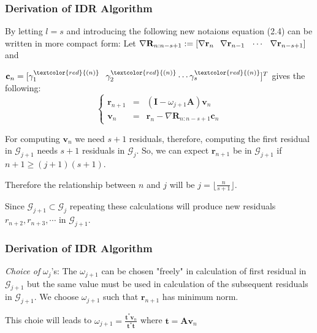 \documentclass[mathserif]{beamer}
\begin{document}
\begin{frame}
\frametitle{Derivation of IDR Algorithm}
By letting $l=s$ and introducing the following new notaions equation (2.4) can be written in more compact form:
\pause
\vspace{.1in}
Let $\nabla \mathbf{R}_{n:n-s+1}:=[\nabla \mathbf{r}_n \hspace{.1in} \nabla \mathbf{r}_{n-1} \hspace{.1in}  \cdots \hspace{.1in} \nabla \mathbf{r}_{n-s+1}  ]$ and 

$\mathbf{c}_n=[\gamma_1 ^ {\textcolor{red}{{(n)}}} \hspace{.1in} \gamma_2 ^ {\textcolor{red}{{(n)}}} \cdots \gamma_s ^ {\textcolor{red}{{(n)}}}]^T$ gives the following:
\pause
\[\left\{ \tag{2.5}\begin{array}{llll} \mathbf{r}_{n+1} &=& (\mathbf{I}-\omega_{j+1} \mathbf{A}) \mathbf{v}_n\\ \mathbf{v}_n&=&\mathbf{r}_n-\nabla \mathbf{R}_{n:n-s+1}\mathbf{c}_n\end{array}\right.\]
\pause

For computing $\mathbf{v}_n$ we need $s+1$ residuals, therefore, computing the first residual in $\mathcal{G}_{j+1}$ needs $s+1$ residuals in $\mathcal{G}_j.$ So, we can expect $\mathbf{r}_{n+1}$ be in $\mathcal{G}_{j+1}$  if $n+1 \ge (j+1)(s+1)$. 

\pause
\vspace{.1in}
Therefore the relationship between $n$ and $j$ will be $j=\lfloor{\frac{n}{s+1}}\rfloor$.

\pause Since $\mathcal{G}_{j+1} \subset \mathcal{G}_j$ repeating these calculations will produce new residuals $r_{n+2}, r_{n+3},  \cdots$ in $\mathcal{G}_{j+1}.$
\end{frame}

\begin{frame}
\frametitle{Derivation of IDR Algorithm}
\textit{Choice of} $\omega_j$'s: The $\omega_{j+1}$ can be chosen "freely" in calculation of first residual in $\mathcal{G}_{j+1}$ but the same value must be used in calculation of the subsequent residuals in $\mathcal{G}_{j+1}.$ We choose $\omega_{j+1}$ such that $\mathbf{r}_{n+1}$ has  minimum norm. \\
\vspace{.1in}

This choie will leads to $\omega_{j+1}=\frac{\mathbf{t}^*\mathbf{v}_n}{\mathbf{t}^*\mathbf{t}}$ where $\mathbf{t}=\mathbf{A}\mathbf{v}_n$
\end{frame}
\end{document}

